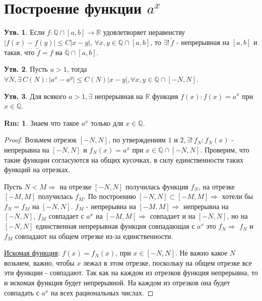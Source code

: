 \documentclass[12pt]{article}
\newcommand{\MR}{\mathbb{R}}
\newcommand{\MQ}{\mathbb{Q}}
\theoremstyle{definition}
\newtheorem{rem}{Rm:}
\newtheorem{prop}{Утв.}
\begin{document}

\section*{Построение функции $a^x$}

\begin{prop}
	Если $f \colon \MQ \cap [a,b] \to \MR$ удовлетворяет неравенству $|f(x) - f(y)| \leq C|x-y|, \, \forall x,y \in \MQ \cap [a,b]$, то $\exists! \, \tilde{f}$ - непрерывная на $[a,b]$ и такая, что $\tilde{f} = f$ на $\MQ \cap [a,b]$.
\end{prop}

\begin{prop}
	Пусть $a >1$, тогда $\forall N, \exists \, C(N) \colon |a^x - a^y| \leq C(N)|x-y|, \forall x,y \in \MQ \cap [-N,N]$.
\end{prop}

\begin{prop}
	Для всякого $a > 1, \exists$ непрерывная на $\MR$ функция $f(x) \colon f(x) = a^x$ при $x \in \MQ$.
\end{prop}
\begin{rem}
	Знаем что такое $a^x$ только для $x \in \MQ$.
\end{rem}

\begin{proof}
	Возьмем отрезок $[-N, N]$, по утверждениям $1$ и $2, \exists! \, f_N \colon f_N(x)$ - непрерывна на $[-N, N]$ и $f_N(x) = a^x$ при $x \in \MQ \cap [-N, N]$. Проверим, что такие функции согласуются на общих кусочках, в силу единственности таких функций на отрезках. 
	
	Пусть $N < M \Rightarrow$ на отрезке $[-N,N]$ получилась функция $f_N$, на отрезке $[-M,M]$ получилась $f_M$. По построению $[-N,N] \subset [-M,M] \Rightarrow$ хотели бы $f_N = f_M$ на $[-N,N]$. $f_M$ - непрерывна на $[-M,M] \Rightarrow$ непрерывна на $[-N,N]$, $f_M$ совпадает с $a^x$ на $[-M,M] \Rightarrow$ совпадает и на $[-N,N]$, но на $[-N,N]$ единственная непрерывная функция совпадающая с $a^x$ это $f_N \Rightarrow$ $f_N$ и $f_M$ совпадают на общем отрезке из-за единственности.
	
	\uline{Искомая функция}: $f(x) = f_N(x)$, при $x \in [-N,N]$. Не важно какое $N$ возьмем, важно, чтобы $x$ лежал в этом отрезке, поскольку на общем отрезке все эти функции - совпадают. Так как на каждом из отрезков функция непрерывна, то и искомая функция будет непрерывной. На каждом из отрезков она будет совпадать с $a^x$ на всех рациональных числах.
\end{proof}
\end{document}
